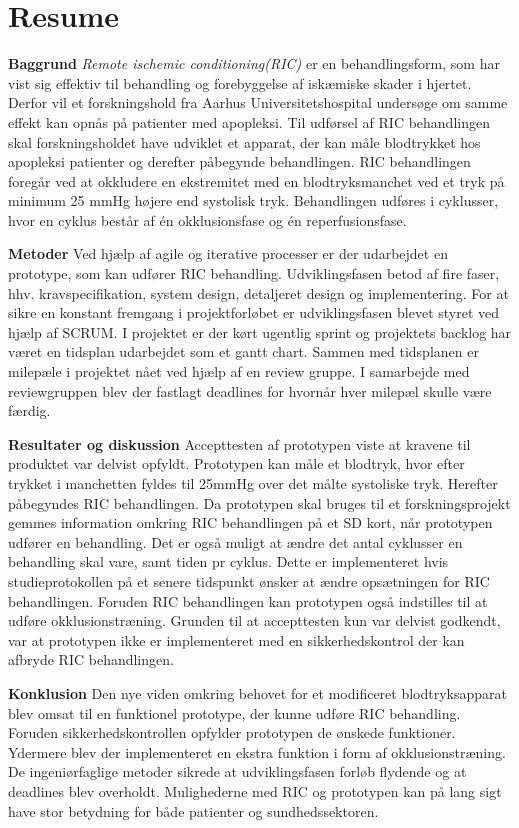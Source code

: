 \chapter*{Resume}
\textbf{Baggrund}
\textit{Remote ischemic conditioning(RIC)} er en behandlingsform, som har vist sig effektiv til behandling og forebyggelse af iskæmiske skader i hjertet. Derfor vil et forskningshold fra Aarhus Universitetshospital undersøge om samme effekt kan opnås på patienter med apopleksi. Til udførsel af RIC behandlingen skal forskningsholdet have udviklet et apparat, der kan måle blodtrykket hos apopleksi patienter og derefter påbegynde behandlingen. RIC behandlingen foregår ved at okkludere en ekstremitet med en blodtryksmanchet ved et tryk på minimum 25 mmHg højere end systolisk tryk. Behandlingen udføres i cyklusser, hvor en cyklus består af én okklusionsfase og én reperfusionsfase. 

\textbf{Metoder}
Ved hjælp af agile og iterative processer er der udarbejdet en prototype, som kan udfører RIC behandling. Udviklingsfasen betod af fire faser, hhv. kravspecifikation, system design, detaljeret design og implementering. For at sikre en konstant fremgang i projektforløbet er udviklingsfasen blevet styret ved hjælp af SCRUM. I projektet er der kørt ugentlig sprint og projektets backlog har været en tidsplan udarbejdet som et gantt chart. Sammen med tidsplanen er milepæle i projektet nået ved hjælp af en review gruppe. I samarbejde med reviewgruppen blev der fastlagt deadlines for hvornår hver milepæl skulle være færdig.

\textbf{Resultater og diskussion}
Accepttesten af prototypen viste at kravene til produktet var delvist opfyldt. Prototypen kan måle et blodtryk, hvor efter trykket i manchetten fyldes til 25mmHg over det målte systoliske tryk. Herefter påbegyndes RIC behandlingen. Da prototypen skal bruges til et forskningsprojekt gemmes information omkring RIC behandlingen på et SD kort, når prototypen udfører en behandling. Det er også muligt at ændre det antal cyklusser en behandling skal vare, samt tiden pr cyklus. Dette er implementeret hvis studieprotokollen på et senere tidspunkt ønsker at ændre opsætningen for RIC behandlingen. Foruden RIC behandlingen kan prototypen også indstilles til at udføre okklusionstræning. Grunden til at accepttesten kun var delvist godkendt, var at prototypen ikke er implementeret med en sikkerhedskontrol der kan afbryde RIC behandlingen. 

\textbf{Konklusion}
 Den nye viden omkring behovet for et modificeret blodtryksapparat blev omsat til en funktionel prototype, der kunne udføre RIC behandling. Foruden sikkerhedskontrollen opfylder prototypen de ønskede funktioner. Ydermere blev der implementeret en ekstra funktion i form af okklusionstræning. De ingeniørfaglige metoder sikrede at udviklingsfasen forløb flydende og at deadlines blev overholdt. Mulighederne med RIC og prototypen kan på lang sigt have stor betydning for både patienter og sundhedssektoren.
